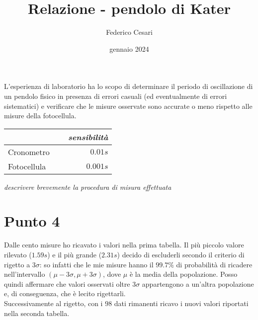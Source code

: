 \documentclass{article}
\title{Relazione - pendolo di Kater}
\author{Federico Cesari}
\date{gennaio 2024}
\begin{document}
	\maketitle
	\vspace{3cm}
	
	L'esperienza di laboratorio ha lo scopo di determinare il periodo di oscillazione di un pendolo fisico in presenza di errori casuali (ed eventualmente di errori sistematici) e verificare che le misure osservate sono accurate o meno rispetto alle misure della fotocellula.
	
	\vspace{0.5cm}
	\begin{table}[H]
		\centering
		\renewcommand{\arraystretch}{1.5}
		\begin{tabular}{lr}
			 & \textit{sensibilità}\\
			 \hline
			Cronometro $\quad$                	& $0.01s$    \\
			Fotocellula  $\quad$                & $0.001s$    \\
		\end{tabular}
		\renewcommand{\arraystretch}{1}
	\end{table}
	\vspace{0.5cm}
	
	\textit{descrivere brevemente la procedura di misura effettuata}
	
	
	
	
	
	
	
	
	
	\newpage
	\section{Punto 4}
	
	Dalle cento misure ho ricavato i valori nella prima tabella. Il più piccolo valore rilevato ($1.59s$) e il più grande ($2.31s$) decido di escluderli secondo il criterio di rigetto a $3\sigma$: so infatti che le mie misure hanno il $99.7 \%$ di probabilità di ricadere nell'intervallo $(\mu  - 3\sigma , \mu + 3\sigma)$, dove $\mu$ è la media della popolazione. Posso quindi affermare che valori osservati oltre $3 \sigma$ appartengono a un'altra popolazione e, di conseguenza, che è lecito rigettarli. \\ 
	
	\noindent
	Successivamente al rigetto, con i $98$ dati rimanenti ricavo i nuovi valori riportati nella seconda tabella.
	
\end{document}
